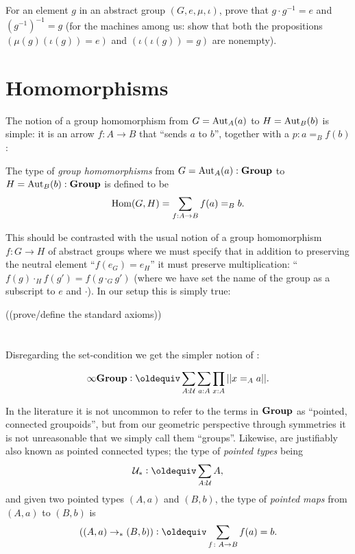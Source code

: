   \begin{xca}
    For an element $g$ in an abstract group $(G,e,\mu,\iota)$, prove that $g\cdot g^{-1}=e$ and $(g^{-1})^{-1}=g$ (for the machines among us: show that both the propositions
$
(\mu{}(g)(\iota{}(g))=e)$ and $
(\iota{}(\iota{}(g))=g)$ are nonempty).
  \end{xca}


\section{Homomorphisms}
\label{sec:hom}


The notion of a group homomorphism from $G=\mathrm{Aut}_A(a)$ to $H=\mathrm{Aut}_B(b)$ is simple: it is an arrow $f:A\to B$ that ``sends $a$ to $b$'', \ie together with a $p:a=_Bf(b)$:
\begin{definition}\label{def:grouphomomorphism}
  The type of {\em group homomorphisms} from $G=\mathrm{Aut}_A(a):\mathbf{Group}$ to $H=\mathrm{Aut}_B(b):\mathbf{Group}$ is defined to be
$$\mathrm{Hom}(G,H)=\sum_{f:A\to B}f(a)=_Bb.
$$
\end{definition}
This should be contrasted with the usual notion of a group homomorphism $f\colon G\to H$ of abstract groups where we must specify that in addition to preserving the neutral element ``$f(e_G)=e_H$'' it must preserve multiplication: ``$f(g)\cdot_H f(g')=f(g\cdot_G g')$ (where we have set the name of the group as a subscript to $e$ and $\cdot$).  In our setup this is simply true:

\begin{definition}\label{def:grouphomomaxioms}
  ((prove/define the standard axioms))
\end{definition}


\section{\inftygps}\label{sec:inftygps}
Disregarding the set-condition we get the simpler notion of \inftygps:
\begin{definition}
  $$\typeinftygp\defequi \sum_{A:\mathcal U}\sum_{a:A}\prod_{x:A}||x=_Aa||.$$
\end{definition}

\begin{remark}\label{rem:pointedtypes}
  In the literature it is not uncommon to refer to the terms in $\mathbf{Group}$ as ``pointed, connected groupoids'', but from our geometric perspective through symmetries it is not unreasonable that we simply call them ``groups''.  Likewise, \inftygps are justifiably also known as pointed connected types;  the type of {\em pointed types} being
$$\pttype\defequi\sum_{A:\mathcal U}A,$$
and given two pointed types $(A,a)$ and $(B,b)$, the type of {\em pointed maps} from $(A,a)$ to $(B,b)$ is
$$((A,a)\to_*(B,b))\defequi\sum_{f\colon A\to B}f(a)=b.$$
\end{remark}

